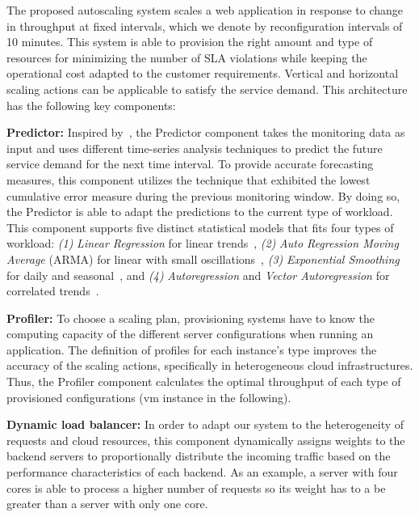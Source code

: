 

The proposed autoscaling system scales a web application in response to change in throughput at fixed intervals, which we denote by reconfiguration intervals of 10 minutes. This system is able to provision the right amount and type of resources for minimizing the number of SLA violations while keeping the operational cost adapted to the customer requirements. Vertical and horizontal scaling actions can be applicable to satisfy the service demand. This architecture has the following key components:

\vspace{2mm}

\textbf{Predictor: } Inspired by~\cite{wolski_network_1999}, the Predictor component takes the monitoring data as input and uses different time-series analysis techniques to predict the future service demand for the next time interval. To provide accurate forecasting measures, this component utilizes the technique that exhibited the lowest cumulative error measure during the previous monitoring window. By doing so, the Predictor is able to adapt the predictions to the current type of workload. This component supports five distinct statistical models that fits four types of workload: \emph{(1)} \emph{Linear Regression} for linear trends~\cite{muppala_regression-based_2012}, \emph{(2)} \emph{Auto Regression Moving Average} (ARMA) for linear with small oscillations~\cite{roy_efficient_2011}, \emph{(3)} \emph{Exponential Smoothing} for daily and seasonal~\cite{exponential_smoothing2010}, and \emph{(4)} \emph{Autoregression} and \emph{Vector Autoregression} for correlated trends~\cite{vector_autoregression_2006,chandra_dynamic_2003}. 

\vspace{2mm}

\textbf{Profiler: } To choose a scaling plan, provisioning systems have to know the computing capacity of the different server configurations when running an application. The definition of profiles for each instance's type improves the accuracy of the scaling actions, specifically in heterogeneous cloud infrastructures. Thus, the Profiler component calculates the optimal throughput of each type of provisioned configurations (vm instance in the following).


\vspace{2mm}

\textbf{Dynamic load balancer: } In order to adapt our system to the heterogeneity of requests and cloud resources, this component dynamically assigns weights to the backend servers to proportionally distribute the incoming traffic based on the performance characteristics of each backend. As an example, a server with four cores is able to process a higher number of requests so its weight has to a be greater than a server with only one core.


